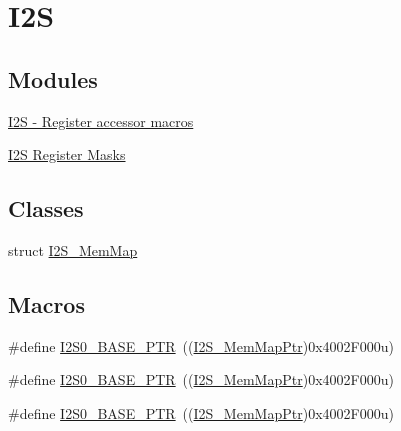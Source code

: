 \hypertarget{group___i2_s___peripheral}{}\section{I2S}
\label{group___i2_s___peripheral}
\subsection*{Modules}
\begin{DoxyCompactItemize}
\item 
\hyperlink{group___i2_s___register___accessor___macros}{I2\+S -\/ Register accessor macros}
\item 
\hyperlink{group___i2_s___register___masks}{I2\+S Register Masks}
\end{DoxyCompactItemize}
\subsection*{Classes}
\begin{DoxyCompactItemize}
\item 
struct \hyperlink{struct_i2_s___mem_map}{I2\+S\+\_\+\+Mem\+Map}
\end{DoxyCompactItemize}
\subsection*{Macros}
\begin{DoxyCompactItemize}
\item 
\#define \hyperlink{group___i2_s___peripheral_ga2eac5d85244610150239927c71b2e147}{I2\+S0\+\_\+\+B\+A\+S\+E\+\_\+\+P\+TR}~((\hyperlink{group___i2_s___peripheral_ga13144089ddabdfb4b30ae97b2ac9c859}{I2\+S\+\_\+\+Mem\+Map\+Ptr})0x4002\+F000u)
\item 
\#define \hyperlink{group___i2_s___peripheral_ga2eac5d85244610150239927c71b2e147}{I2\+S0\+\_\+\+B\+A\+S\+E\+\_\+\+P\+TR}~((\hyperlink{group___i2_s___peripheral_ga13144089ddabdfb4b30ae97b2ac9c859}{I2\+S\+\_\+\+Mem\+Map\+Ptr})0x4002\+F000u)
\item 
\#define \hyperlink{group___i2_s___peripheral_ga2eac5d85244610150239927c71b2e147}{I2\+S0\+\_\+\+B\+A\+S\+E\+\_\+\+P\+TR}~((\hyperlink{group___i2_s___peripheral_ga13144089ddabdfb4b30ae97b2ac9c859}{I2\+S\+\_\+\+Mem\+Map\+Ptr})0x4002\+F000u)
\end{DoxyCompactItemize}
